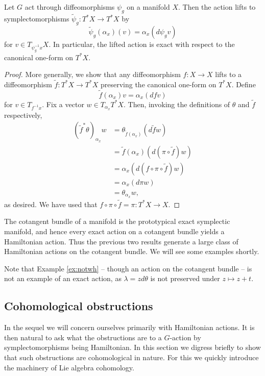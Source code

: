 \documentclass{amsart}
\begin{document}
\begin{lemma}
    Let $G$ act through diffeomorphisms $\psi_g$ on a manifold $X$. Then the action
    lifts to symplectomorphisms $\tilde \psi_g:T^*X\to T^*X$ by
    \begin{equation*}
        \tilde\psi_g(\alpha_x)(v) = \alpha_x(d\psi_gv)
    \end{equation*}
    for $v\in T_{\psi_g^{-1}x}X$. In particular, the lifted action is exact with respect
    to the canonical one-form on $T^*X$.
\end{lemma}
\begin{proof}
    More generally, we show that any diffeomorphism $f:X\to X$ lifts to a diffeomorphism 
    $\tilde f:T^*X\to T^*X$ preserving the canonical one-form on $T^*X$. Define
    \begin{equation*}
        \tilde f(\alpha_x)v = \alpha_x(df v)
    \end{equation*}
    for $v\in T_{f^{-1}x}$. Fix a vector $w\in T_{\alpha_x}T^*X$. Then, invoking the definitions
    of $\theta$ and $\tilde f$ respectively,
    \begin{align*}
        (\tilde f^*\theta)_{\alpha_x}w &= \theta_{\tilde f(\alpha_x)}(d\tilde fw)\\
        &= \tilde f(\alpha_x)(d(\pi\circ\tilde f)w)\\
        &= \alpha_x(d(f\circ \pi\circ \tilde f)w)\\
        &= \alpha_x(d\pi w)\\
        &= \theta_{\alpha_x}w,
    \end{align*}
    as desired. We have used that $f\circ\pi\circ\tilde f=\pi:T^*X\to X$.
\end{proof}

The cotangent bundle of a manifold is the prototypical exact symplectic manifold, and hence
every exact action on a cotangent bundle yields a Hamiltonian action. Thus the previous two
results generate a large class of Hamiltonian actions on the cotangent bundle. We will see
some examples shortly.

Note that Example
\ref{ex:notwh} -- though an action on the cotangent bundle -- is not an example of an
exact action, as $\lambda=zd\theta$ is not preserved under $z\mapsto z+t$.

\subsection{Cohomological obstructions}

In the sequel we will concern ourselves primarily with Hamiltonian actions.
It is then natural to ask what the obstructions are to a $G$-action by symplectomorphisms
being Hamiltonian. In this section we digress briefly to show that such obstructions 
are cohomological in nature. For this we quickly introduce the machinery of Lie
algebra cohomology.
\end{document}
